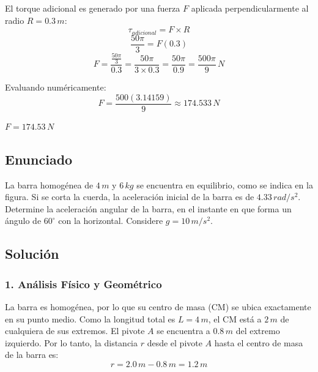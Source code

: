 \documentclass[12pt, a4paper]{article}
\begin{document}
El torque adicional es generado por una fuerza $F$ aplicada perpendicularmente al radio $R = 0.3 \, \si{m}$:
$$\tau_{adicional} = F \times R$$
$$\frac{50\pi}{3} = F (0.3)$$
$$F = \frac{\frac{50\pi}{3}}{0.3} = \frac{50\pi}{3 \times 0.3} = \frac{50\pi}{0.9} = \frac{500\pi}{9} \, \si{N}$$

Evaluando numéricamente:
$$F = \frac{500(3.14159)}{9} \approx 174.533 \, \si{N}$$

\begin{tcolorbox}[colback=green!5!white, colframe=green!50!black, title=Respuesta Final]
\centering \Large $F = 174.53 \, \si{N}$
\end{tcolorbox}

\newpage

\subsection*{Enunciado}
La barra homogénea de $4 \, \si{m}$ y $6 \, \si{kg}$ se encuentra en equilibrio, como se indica en la figura. Si se corta la cuerda, la aceleración inicial de la barra es de $4.33 \, \si{rad/s^2}$. Determine la aceleración angular de la barra, en el instante en que forma un ángulo de $60^\circ$ con la horizontal. Considere $g = 10 \, \si{m/s^2}$.

\begin{center}
\end{center}

\subsection*{Solución}

\subsubsection*{1. Análisis Físico y Geométrico}
La barra es homogénea, por lo que su centro de masa (CM) se ubica exactamente en su punto medio. Como la longitud total es $L = 4 \, \si{m}$, el CM está a $2 \, \si{m}$ de cualquiera de sus extremos.
El pivote $A$ se encuentra a $0.8 \, \si{m}$ del extremo izquierdo. 
Por lo tanto, la distancia $r$ desde el pivote $A$ hasta el centro de masa de la barra es:
$$r = 2.0 \, \si{m} - 0.8 \, \si{m} = 1.2 \, \si{m}$$
\end{document}
